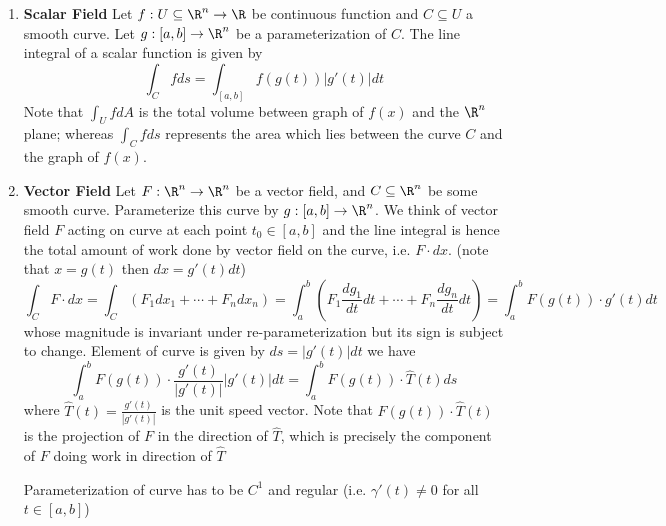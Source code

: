 \documentclass[11pt]{article}
\begin{document}
\begin{enumerate}
  \item \textbf{Scalar Field} Let $f:U\subseteq \R^n \to \R$ be continuous function and $C\subseteq U$ a smooth curve. Let $g: [a,b] \to \R^n$ be a parameterization of $C$. The line integral of a scalar function is given by
  \[
    \int_C f ds = \int_{[a,b]} f(g(t)) | g'(t) | dt
  \]
  Note that $\int_{U} f dA$ is the total volume between graph of $f(x)$ and the $\R^n$ plane; whereas $\int_C f ds$ represents the area which lies between the curve $C$ and the graph of $f(x)$.
  \item \textbf{Vector Field} Let $F: \R^n \to \R^n$ be a vector field, and $C\subseteq \R^n$ be some smooth curve. Parameterize this curve by $g:[a,b] \to\R^n$. We think of vector field $F$ acting on curve at each point $t_0 \in [a,b]$ and the line integral is hence the total amount of work done by vector field on the curve, i.e. $F\cdot dx$. (note that $x = g(t)$ then $dx = g'(t)dt$)
  \[
    \int_C F \cdot dx = \int_C (F_1dx_1 + \cdots + F_ndx_n) = \int_a^b (F_1\frac{dg_1}{dt}dt + \cdots + F_n\frac{dg_n}{dt}dt) = \int_a^b F(g(t))\cdot g'(t)dt
  \]
  whose magnitude is invariant under re-parameterization but its sign is subject to change. Element of curve is given by $ds = | g'(t) | dt$ we have
  \[
    \int_a^b F(g(t)) \cdot \frac{g'(t)}{|g'(t)|}|g'(t)|dt = \int_a^b F(g(t)) \cdot \hat{T}(t)ds
  \]
  where $\hat{T}(t) = \frac{g'(t)}{|g'(t)|}$ is the unit speed vector. Note that $F(g(t)) \cdot \hat{T}(t)$ is the projection of $F$ in the direction of $\hat{T}$, which is precisely the component of $F$ doing work in direction of $\hat{T}$
  \begin{rem}
    Parameterization of curve has to be $C^1$ and regular (i.e. $\gamma'(t) \neq 0$ for all $t\in [a,b]$)
  \end{rem}
\end{enumerate}
\end{document}
